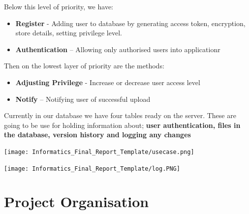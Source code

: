 \documentclass[11pt]{informatics-report}
\begin{document}
Below this level of priority, we have:

\begin{itemize}
\item \textbf{Register} -  Adding user to database by generating access token, encryption, store details, setting privilege level.
\item \textbf{Authentication} – Allowing only authorised users into applicationr
\end{itemize}

Then on the lowest layer of priority are the methods:

\begin{itemize}
\item \textbf{Adjusting Privilege } -  Increase or decrease user access level
\item \textbf{Notify } – Notifying user of successful upload
\end{itemize}

Currently in our database we have four tables ready on the server. These are going to be use for holding information about; \textbf{user authentication, files in the database, version history and logging any changes}

\begin{minipage}{0.9\linewidth}
\texttt{[image: Informatics\_Final\_Report\_Template/usecase.png]}
\end{minipage}%

\begin{minipage}{0.9\linewidth}
\texttt{[image: Informatics\_Final\_Report\_Template/log.PNG]}
\end{minipage}%



\chapter{Project Organisation}
\end{document}
